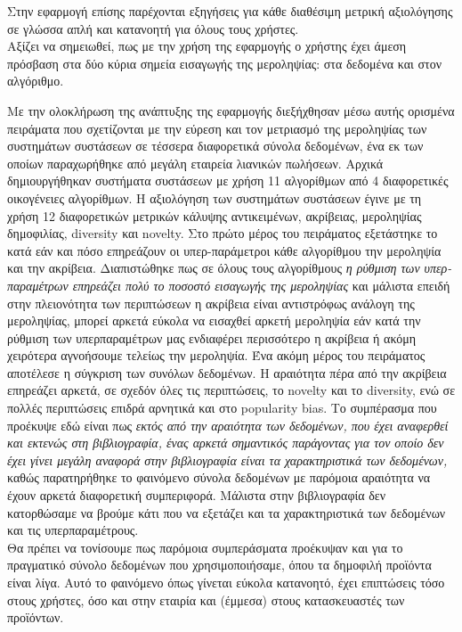 Στην εφαρμογή επίσης παρέχονται εξηγήσεις για κάθε διαθέσιμη μετρική αξιολόγησης σε γλώσσα απλή και κατανοητή για όλους τους χρήστες.\\
Αξίζει να σημειωθεί, πως με την χρήση της εφαρμογής ο χρήστης έχει άμεση πρόσβαση στα δύο κύρια σημεία εισαγωγής της μεροληψίας: στα δεδομένα και στον αλγόριθμο.

\noindent Με την ολοκλήρωση της ανάπτυξης της εφαρμογής διεξήχθησαν μέσω αυτής ορισμένα πειράματα που σχετίζονται με την εύρεση και τον μετριασμό της μεροληψίας των συστημάτων συστάσεων σε τέσσερα διαφορετικά σύνολα δεδομένων, ένα εκ των οποίων παραχωρήθηκε από μεγάλη εταιρεία λιανικών πωλήσεων. Αρχικά δημιουργήθηκαν συστήματα συστάσεων με χρήση 11 αλγορίθμων από 4 διαφορετικές οικογένειες αλγορίθμων. Η αξιολόγηση των συστημάτων συστάσεων έγινε με τη χρήση 12 διαφορετικών μετρικών κάλυψης αντικειμένων, ακρίβειας, μεροληψίας δημοφιλίας, diversity και novelty. 
Στο πρώτο μέρος του πειράματος εξετάστηκε το κατά εάν και πόσο επηρεάζουν οι υπερ-παράμετροι κάθε αλγορίθμου την μεροληψία και την ακρίβεια. Διαπιστώθηκε πως σε όλους τους αλγορίθμους\textit{ η ρύθμιση των υπερ-παραμέτρων επηρεάζει πολύ το ποσοστό εισαγωγής της μεροληψίας} και μάλιστα επειδή στην πλειονότητα των περιπτώσεων η ακρίβεια είναι αντιστρόφως ανάλογη της μεροληψίας, μπορεί αρκετά εύκολα να εισαχθεί αρκετή μεροληψία εάν κατά την ρύθμιση των υπερπαραμέτρων μας ενδιαφέρει περισσότερο η ακρίβεια ή ακόμη χειρότερα αγνοήσουμε τελείως την μεροληψία. Ένα ακόμη μέρος του πειράματος αποτέλεσε η σύγκριση των συνόλων δεδομένων. Η αραιότητα πέρα από την ακρίβεια επηρεάζει αρκετά, σε σχεδόν όλες τις περιπτώσεις, το novelty και το diversity, ενώ σε πολλές περιπτώσεις επιδρά αρνητικά και στο popularity bias. Το συμπέρασμα που προέκυψε εδώ είναι πως \textit{εκτός από την αραιότητα των δεδομένων, που έχει αναφερθεί και εκτενώς στη βιβλιογραφία, ένας αρκετά σημαντικός παράγοντας για τον οποίο δεν έχει γίνει μεγάλη αναφορά στην βιβλιογραφία είναι τα χαρακτηριστικά των δεδομένων,} καθώς παρατηρήθηκε το φαινόμενο σύνολα δεδομένων με παρόμοια αραιότητα να έχουν αρκετά διαφορετική συμπεριφορά. Μάλιστα στην βιβλιογραφία δεν κατορθώσαμε να βρούμε κάτι που να εξετάζει και τα χαρακτηριστικά των δεδομένων και τις υπερπαραμέτρους. \\
Θα πρέπει να τονίσουμε πως παρόμοια συμπεράσματα προέκυψαν και για το πραγματικό σύνολο δεδομένων που χρησιμοποιήσαμε, όπου τα δημοφιλή προϊόντα είναι λίγα. Αυτό το φαινόμενο όπως γίνεται εύκολα κατανοητό, έχει επιπτώσεις τόσο στους χρήστες, όσο και στην εταιρία και (έμμεσα) στους κατασκευαστές των προϊόντων.

